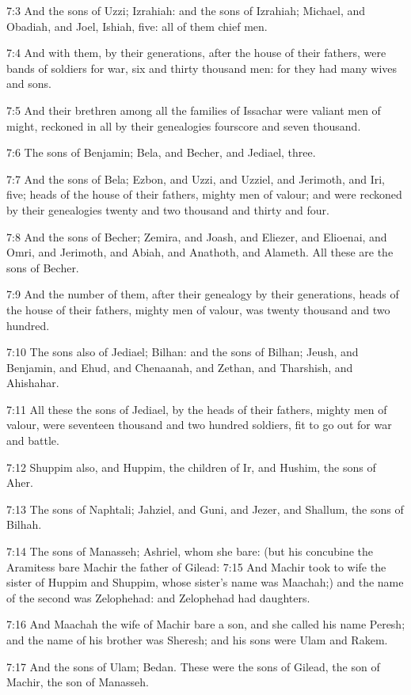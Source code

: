 7:3 And the sons of Uzzi; Izrahiah: and the sons of Izrahiah; Michael, and Obadiah, and Joel, Ishiah, five: all of them chief men.

7:4 And with them, by their generations, after the house of their fathers, were bands of soldiers for war, six and thirty thousand men: for they had many wives and sons.

7:5 And their brethren among all the families of Issachar were valiant men of might, reckoned in all by their genealogies fourscore and seven thousand.

7:6 The sons of Benjamin; Bela, and Becher, and Jediael, three.

7:7 And the sons of Bela; Ezbon, and Uzzi, and Uzziel, and Jerimoth, and Iri, five; heads of the house of their fathers, mighty men of valour; and were reckoned by their genealogies twenty and two thousand and thirty and four.

7:8 And the sons of Becher; Zemira, and Joash, and Eliezer, and Elioenai, and Omri, and Jerimoth, and Abiah, and Anathoth, and Alameth. All these are the sons of Becher.

7:9 And the number of them, after their genealogy by their generations, heads of the house of their fathers, mighty men of valour, was twenty thousand and two hundred.

7:10 The sons also of Jediael; Bilhan: and the sons of Bilhan; Jeush, and Benjamin, and Ehud, and Chenaanah, and Zethan, and Tharshish, and Ahishahar.

7:11 All these the sons of Jediael, by the heads of their fathers, mighty men of valour, were seventeen thousand and two hundred soldiers, fit to go out for war and battle.

7:12 Shuppim also, and Huppim, the children of Ir, and Hushim, the sons of Aher.

7:13 The sons of Naphtali; Jahziel, and Guni, and Jezer, and Shallum, the sons of Bilhah.

7:14 The sons of Manasseh; Ashriel, whom she bare: (but his concubine the Aramitess bare Machir the father of Gilead: 7:15 And Machir took to wife the sister of Huppim and Shuppim, whose sister's name was Maachah;) and the name of the second was Zelophehad: and Zelophehad had daughters.

7:16 And Maachah the wife of Machir bare a son, and she called his name Peresh; and the name of his brother was Sheresh; and his sons were Ulam and Rakem.

7:17 And the sons of Ulam; Bedan. These were the sons of Gilead, the son of Machir, the son of Manasseh.

